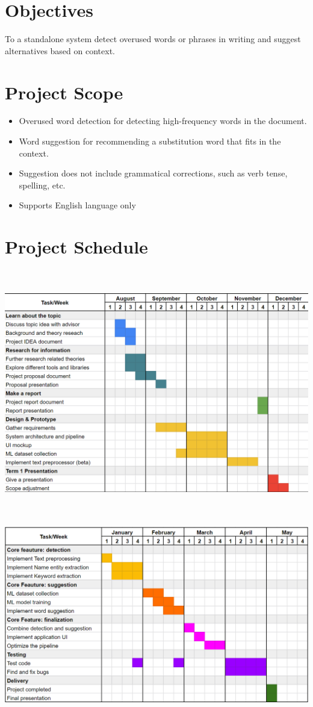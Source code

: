 \documentclass[12pt,oneside,openright,a4paper]{cpe-english-project}
\begin{document}
\section{Objectives}
To a standalone system detect overused words or phrases in writing and suggest alternatives based on context.

\section{Project Scope}
\begin{itemize}
\item Overused word detection for detecting high-frequency words in the document.
\item Word suggestion for recommending a substitution word that fits in the context.
\item Suggestion does not include grammatical corrections, such as verb tense, spelling, etc.
\item Supports English language only
\end{itemize}

\section{Project Schedule}
\\ \\
\includegraphics[width=15cm]{./img/chp1/schedule1.png}

\\ \\
\includegraphics[width=15cm]{./img/chp1/schedule2.png}\\
\end{document}
